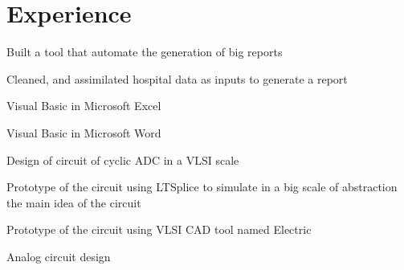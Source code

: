\documentclass[letterpaper]{deedy-resume} %
\begin{document}
\hfill
%
%
\begin{minipage}[t]{0.66\textwidth} %




\section{Experience}


\vspace{\topsep} %
\begin{tightitemize}
\item Built a tool that automate the generation of big reports 
\item Cleaned, and assimilated hospital data as inputs to generate a report 
\item Visual Basic in Microsoft Excel
\item Visual Basic in Microsoft Word
\end{tightitemize}

\sectionspace %





\vspace{\topsep} %
\begin{tightitemize}
\item Design of circuit of cyclic ADC in a VLSI scale
\item Prototype of the circuit using LTSplice to simulate in a big scale of abstraction the main idea of the circuit
\item Prototype of the circuit using VLSI CAD tool named Electric
\item Analog circuit design
\end{tightitemize}


\end{minipage}
\end{document}
